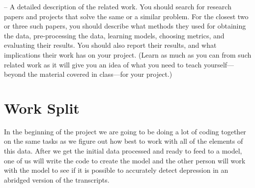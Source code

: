 – A detailed description of the related work. You should search for
research papers and projects that solve the same or a similar problem.
For the closest two or three such papers, you should describe what
methods they used for obtaining the data, pre-processing the data,
learning models, choosing metrics, and evaluating their results. You
should also report their results, and what implications their work has
on your project. (Learn as much as you can from such related work as
it will give you an idea of what you need to teach yourself—beyond the
material covered in class—for your project.)





\section{Work Split}

In the beginning of the project we are going to be doing a lot of coding together on the same tasks as we figure out how best to work with all of the elements of this data. After we get the initial data processed and ready to feed to a model, one of us will write the code to create the model and the other person will work with the model to see if it is possible to accurately detect depression in an abridged version of the transcripts. 